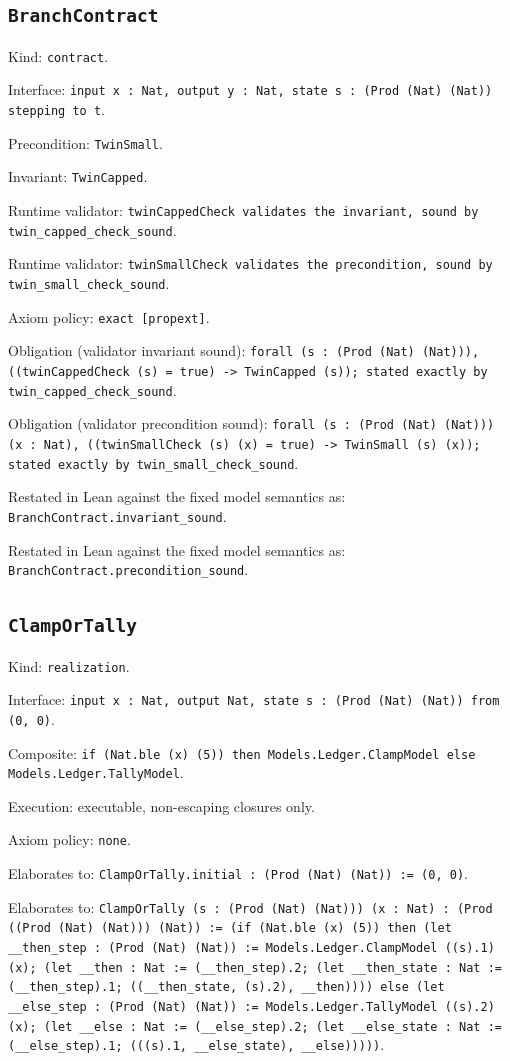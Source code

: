\documentclass[11pt]{article}
\begin{document}
\subsection*{\texttt{BranchContract}}
\noindent Kind: \texttt{contract}.\par
\noindent Interface: \texttt{input x : Nat, output y : Nat, state s : (Prod (Nat) (Nat)) stepping to t}.\par
\noindent Precondition: \texttt{TwinSmall}.\par
\noindent Invariant: \texttt{TwinCapped}.\par
\noindent Runtime validator: \texttt{twinCappedCheck validates the invariant, sound by twin\_capped\_check\_sound}.\par
\noindent Runtime validator: \texttt{twinSmallCheck validates the precondition, sound by twin\_small\_check\_sound}.\par
\noindent Axiom policy: \texttt{exact [propext]}.\par
\noindent Obligation (validator invariant sound): \texttt{forall (s : (Prod (Nat) (Nat))), ((twinCappedCheck (s) = true) -> TwinCapped (s)); stated exactly by twin\_capped\_check\_sound}.\par
\noindent Obligation (validator precondition sound): \texttt{forall (s : (Prod (Nat) (Nat))) (x : Nat), ((twinSmallCheck (s) (x) = true) -> TwinSmall (s) (x)); stated exactly by twin\_small\_check\_sound}.\par
\noindent Restated in Lean against the fixed model semantics as: \texttt{BranchContract.invariant\_sound}.\par
\noindent Restated in Lean against the fixed model semantics as: \texttt{BranchContract.precondition\_sound}.\par
\subsection*{\texttt{ClampOrTally}}
\noindent Kind: \texttt{realization}.\par
\noindent Interface: \texttt{input x : Nat, output Nat, state s : (Prod (Nat) (Nat)) from (0, 0)}.\par
\noindent Composite: \texttt{if (Nat.ble (x) (5)) then Models.Ledger.ClampModel else Models.Ledger.TallyModel}.\par
\noindent Execution: executable, non-escaping closures only.\par
\noindent Axiom policy: \texttt{none}.\par
\noindent Elaborates to: \texttt{ClampOrTally.initial : (Prod (Nat) (Nat)) := (0, 0)}.\par
\noindent Elaborates to: \texttt{ClampOrTally (s : (Prod (Nat) (Nat))) (x : Nat) : (Prod ((Prod (Nat) (Nat))) (Nat)) := (if (Nat.ble (x) (5)) then (let \_\_then\_step : (Prod (Nat) (Nat)) := Models.Ledger.ClampModel ((s).1) (x); (let \_\_then : Nat := (\_\_then\_step).2; (let \_\_then\_state : Nat := (\_\_then\_step).1; ((\_\_then\_state, (s).2), \_\_then)))) else (let \_\_else\_step : (Prod (Nat) (Nat)) := Models.Ledger.TallyModel ((s).2) (x); (let \_\_else : Nat := (\_\_else\_step).2; (let \_\_else\_state : Nat := (\_\_else\_step).1; (((s).1, \_\_else\_state), \_\_else)))))}.\par
\end{document}
